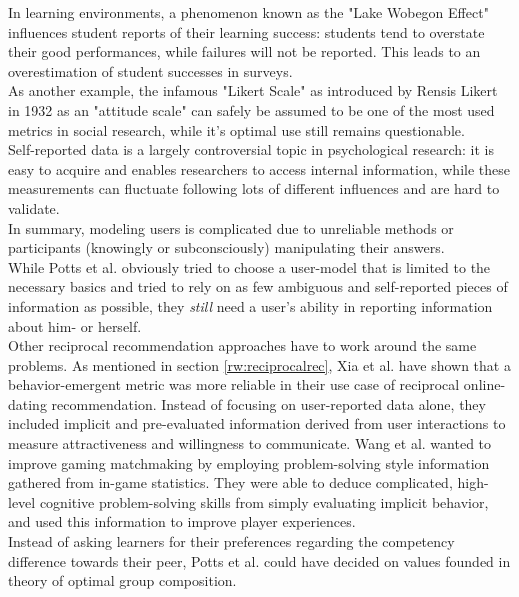 \documentclass[conference]{IEEEtran}
\begin{document}
In learning environments, a phenomenon known as the "Lake Wobegon Effect" influences student reports of their learning success: students tend to overstate their good performances, while failures will not be reported. This leads to an overestimation of student successes in surveys. \cite{maxwell1994lake}\\
As another example, the infamous "Likert Scale" as introduced by Rensis Likert in 1932 as an "attitude scale" \cite{likert1932technique} can safely be assumed to be one of the most used metrics in social research, while it's optimal use still remains questionable. \cite{chang1994psychometric, lee2002cultural}\\
Self-reported data is a largely controversial topic in psychological research: it is easy to acquire and enables researchers to access internal information, while these measurements can fluctuate following lots of different influences and are hard to validate. \cite{gonyea2005self, lee2002cultural, sorensen2008measuring}\\
In summary, modeling users is complicated due to unreliable methods or participants (knowingly or subconsciously) manipulating their answers.\\
While Potts et al. obviously tried to choose a user-model that is limited to the necessary basics and tried to rely on as few ambiguous and self-reported pieces of information as possible, they \textit{still} need a user's ability in reporting information about him- or herself.\\
Other reciprocal recommendation approaches have to work around the same problems. As mentioned in section \ref{rw:reciprocalrec}, Xia et al. have shown that a behavior-emergent metric was more reliable in their use case of reciprocal online-dating recommendation. \cite{xia2014characterization} Instead of focusing on user-reported data alone, they included implicit and pre-evaluated information derived from user interactions to measure attractiveness and willingness to communicate. \cite{xia2015reciprocal} Wang et al. wanted to improve gaming matchmaking by employing problem-solving style information gathered from in-game statistics. They were able to deduce complicated, high-level cognitive problem-solving skills from simply evaluating implicit behavior, and used this information to improve player experiences. \cite{wang2015thinking}\\
Instead of asking learners for their preferences regarding the competency difference towards their peer, Potts et al. could have decided on values founded in theory of optimal group composition. \cite{manske2015using}\\
\end{document}
